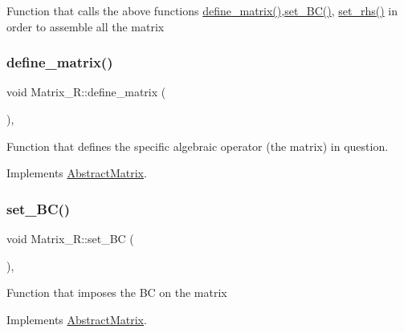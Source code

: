 Function that calls the above functions \hyperlink{classMatrix__R_a311aefa7be3bbb741d1958e840bc4613}{define\+\_\+matrix()},\hyperlink{classMatrix__R_a33b829a44256d8d363891f3fc3d58244}{set\+\_\+\+B\+C()}, \hyperlink{classMatrix__R_a6305da2e94b8841f14061f3ad1ed9464}{set\+\_\+rhs()} in order to assemble all the matrix \mbox{\label{classMatrix__R_a311aefa7be3bbb741d1958e840bc4613}} 
\subsubsection{\texorpdfstring{define\+\_\+matrix()}{define\_matrix()}}
{\footnotesize\ttfamily void Matrix\+\_\+\+R\+::define\+\_\+matrix (\begin{DoxyParamCaption}{ }\end{DoxyParamCaption})\hspace{0.3cm}{\ttfamily [override]}, {\ttfamily [virtual]}}

Function that defines the specific algebraic operator (the matrix) in question. 

Implements \hyperlink{classAbstractMatrix_a40016da151226fbfcd444839943d8fe3}{Abstract\+Matrix}.

\mbox{\label{classMatrix__R_a33b829a44256d8d363891f3fc3d58244}} 
\subsubsection{\texorpdfstring{set\+\_\+\+B\+C()}{set\_BC()}}
{\footnotesize\ttfamily void Matrix\+\_\+\+R\+::set\+\_\+\+BC (\begin{DoxyParamCaption}{ }\end{DoxyParamCaption})\hspace{0.3cm}{\ttfamily [override]}, {\ttfamily [virtual]}}

Function that imposes the BC on the matrix 

Implements \hyperlink{classAbstractMatrix_aa0a17dacbeede4180531b115d4a9f3eb}{Abstract\+Matrix}.

\mbox{\label{classMatrix__R_a3892fa1560916146774ac953f9f6474c}} 
